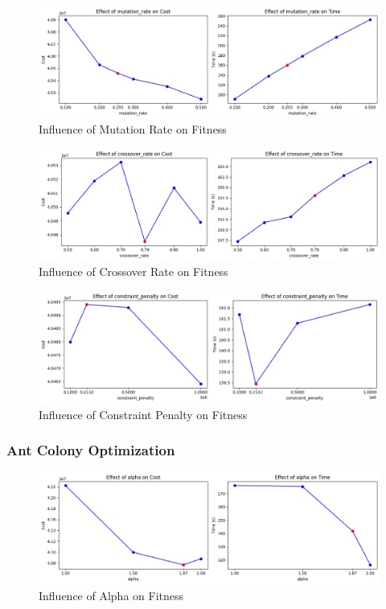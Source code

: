\documentclass{article}
\begin{document}
\begin{figure}[H]
    \centering
    \includegraphics[width=\linewidth]{effect_of_mutation_rate.png}
    \caption{Influence of Mutation Rate on Fitness}
    \label{fig:mutation_rate}
\end{figure}

\begin{figure}[H]
    \centering
    \includegraphics[width=\linewidth]{effect_of_crossover_rate.png}
    \caption{Influence of Crossover Rate on Fitness}
    \label{fig:crossover_rate}
\end{figure}

\begin{figure}[H]
    \centering
    \includegraphics[width=\linewidth]{effect_of_constraint_penalty.png}
    \caption{Influence of Constraint Penalty on Fitness}
    \label{fig:constraint_penalty}
\end{figure}

\subsubsection{Ant Colony Optimization}
\begin{figure}[H]
    \centering
    \includegraphics[width=\linewidth]{effect_of_alpha.png}
    \caption{Influence of Alpha on Fitness}
    \label{fig:alpha}
\end{figure}
\end{document}
